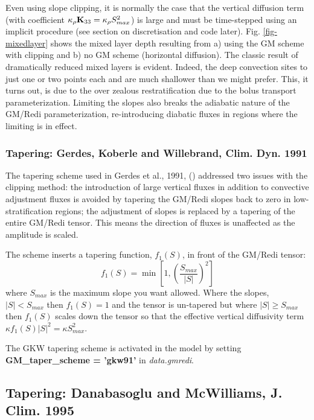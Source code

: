 Even using slope clipping, it is normally the case that the vertical
diffusion term (with coefficient $\kappa_\rho{\bf K}_{33} =
\kappa_\rho S_{max}^2$) is large and must be time-stepped using an
implicit procedure (see section on discretisation and code later).
Fig. \ref{fig-mixedlayer} shows the mixed layer depth resulting from
a) using the GM scheme with clipping and b) no GM scheme (horizontal
diffusion). The classic result of dramatically reduced mixed layers is
evident. Indeed, the deep convection sites to just one or two points
each and are much shallower than we might prefer. This, it turns out,
is due to the over zealous restratification due to the bolus transport
parameterization. Limiting the slopes also breaks the adiabatic nature
of the GM/Redi parameterization, re-introducing diabatic fluxes in
regions where the limiting is in effect.

\subsubsection{Tapering: Gerdes, Koberle and Willebrand, Clim. Dyn. 1991}

The tapering scheme used in Gerdes et al., 1991, (\cite{gkw91})
addressed two issues with the clipping method: the introduction of
large vertical fluxes in addition to convective adjustment fluxes is
avoided by tapering the GM/Redi slopes back to zero in
low-stratification regions; the adjustment of slopes is replaced by a
tapering of the entire GM/Redi tensor. This means the direction of
fluxes is unaffected as the amplitude is scaled.

The scheme inserts a tapering function, $f_1(S)$, in front of the
GM/Redi tensor:
\begin{equation}
f_1(S) = \min \left[ 1, \left( \frac{S_{max}}{|S|}\right)^2 \right]
\end{equation}
where $S_{max}$ is the maximum slope you want allowed. Where the
slopes, $|S|<S_{max}$ then $f_1(S) = 1$ and the tensor is un-tapered
but where $|S| \ge S_{max}$ then $f_1(S)$ scales down the tensor so
that the effective vertical diffusivity term $\kappa f_1(S) |S|^2 =
\kappa S_{max}^2$.

The GKW tapering scheme is activated in the model by setting {\bf
GM\_tap\-er\_scheme = 'gkw91'} in {\em data.gmredi}.

\subsection{Tapering: Danabasoglu and McWilliams, J. Clim. 1995}

